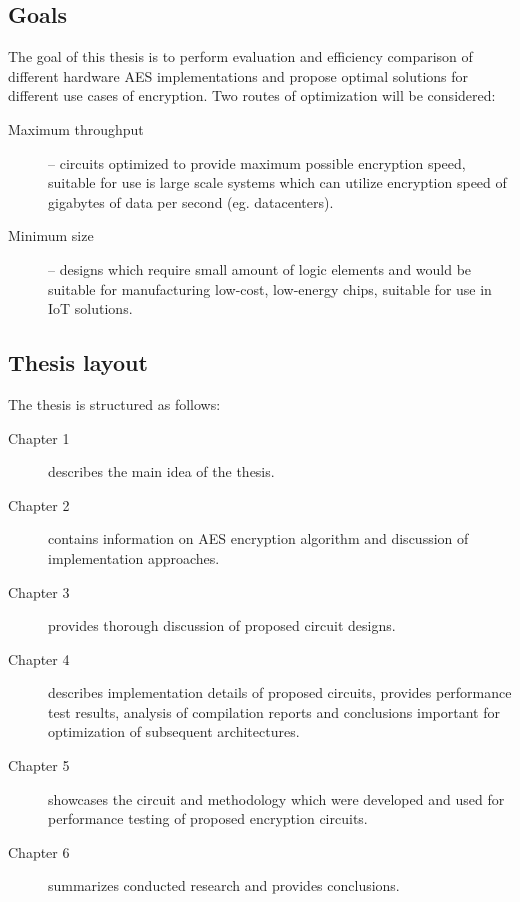 




\subsection{Goals}
\label{sec:goals}
The goal of this thesis is to perform evaluation and efficiency comparison of different hardware AES implementations and propose optimal solutions for different use cases of encryption. Two routes of optimization will be considered:
\begin{description}
\item[Maximum throughput] -- circuits optimized to provide maximum possible encryption speed, suitable for use is large scale systems which can utilize encryption speed of gigabytes of data per second (eg. datacenters).
\item[Minimum size] -- designs which require small amount of logic elements and would be suitable for manufacturing low-cost, low-energy chips, suitable for use in IoT solutions.
\end{description}

\subsection{Thesis layout}
\label{sec:layout}
The thesis is structured as follows:
\begin{description}
\item[Chapter 1] describes the main idea of the thesis.
\item[Chapter 2] contains information on AES encryption algorithm and discussion of implementation approaches.
\item[Chapter 3] provides thorough discussion of proposed circuit designs.
\item[Chapter 4] describes implementation details of proposed circuits, provides performance test results, analysis of compilation reports and conclusions important for optimization of subsequent architectures.
\item[Chapter 5] showcases the circuit and methodology which were developed and used for performance testing of proposed encryption circuits.
\item[Chapter 6] summarizes conducted research and provides conclusions.
\end{description}